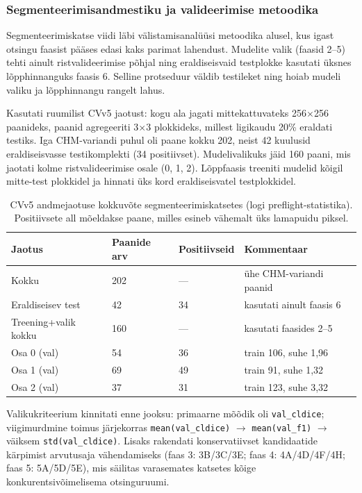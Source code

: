 \subsubsection{Segmenteerimisandmestiku ja valideerimise metoodika}
\label{segmenteerimise-andmestik-metoodika}

Segmenteerimiskatse viidi läbi välistamisanalüüsi metoodika alusel, kus igast otsingu faasist pääses edasi kaks parimat lahendust. Mudelite valik (faasid 2--5) tehti ainult ristvalideerimise põhjal ning eraldiseisvaid testplokke kasutati üksnes lõpphinnanguks faasis 6. Selline protseduur väldib testileket ning hoiab mudeli valiku ja lõpphinnangu rangelt lahus.

Kasutati ruumilist CVv5 jaotust: kogu ala jagati mittekattuvateks 256$\times$256 paanideks, paanid agregeeriti 3$\times$3 plokkideks, millest ligikaudu 20\% eraldati testiks. Iga CHM-variandi puhul oli paane kokku 202, neist 42 kuulusid eraldiseisvasse testikomplekti (34 positiivset). Mudelivalikuks jäid 160 paani, mis jaotati kolme ristvalideerimise osale (0, 1, 2). Lõppfaasis treeniti mudelid kõigil mitte-test plokkidel ja hinnati üks kord eraldiseisvatel testplokkidel.

\begin{table}[h!]
\centering
\caption{CVv5 andmejaotuse kokkuvõte segmenteerimiskatsetes (logi preflight-statistika). Positiivsete all mõeldakse paane, milles esineb vähemalt üks lamapuidu piksel.}
\label{tab:seg-cvv5-split}
\begin{tabular}{llll}
\hline
\textbf{Jaotus} & \textbf{Paanide arv} & \textbf{Positiivseid} & \textbf{Kommentaar} \\
\hline
Kokku & 202 & --- & ühe CHM-variandi paanid \\
Eraldiseisev test & 42 & 34 & kasutati ainult faasis 6 \\
Treening+valik kokku & 160 & --- & kasutati faasides 2--5 \\
Osa 0 (val) & 54 & 36 & train 106, suhe 1,96 \\
Osa 1 (val) & 69 & 49 & train 91, suhe 1,32 \\
Osa 2 (val) & 37 & 31 & train 123, suhe 3,32 \\
\hline
\end{tabular}
\end{table}

Valikukriteerium kinnitati enne jooksu: primaarne mõõdik oli \texttt{val\_cldice}; viigimurdmine toimus järjekorras \texttt{mean(val\_cldice)} $\rightarrow$ \texttt{mean(val\_f1)} $\rightarrow$ väiksem \texttt{std(val\_cldice)}. Lisaks rakendati konservatiivset kandidaatide kärpimist arvutusaja vähendamiseks (faas 3: 3B/3C/3E; faas 4: 4A/4D/4F/4H; faas 5: 5A/5D/5E), mis säilitas varasemates katsetes kõige konkurentsivõimelisema otsinguruumi.

